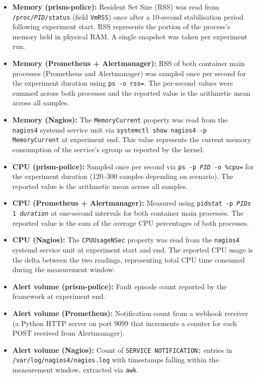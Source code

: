 \begin{itemize}
\item \textbf{Memory (prism-police):} Resident Set Size (RSS) was read from \texttt{/proc/\textit{PID}/status} (field \texttt{VmRSS}) once after a 10-second stabilisation period following experiment start. RSS represents the portion of the process's memory held in physical RAM. A single snapshot was taken per experiment run.
\item \textbf{Memory (Prometheus + Alertmanager):} RSS of both container main processes (Prometheus and Alertmanager) was sampled once per second for the experiment duration using \texttt{ps -o rss=}. The per-second values were summed across both processes and the reported value is the arithmetic mean across all samples.
\item \textbf{Memory (Nagios):} The \texttt{MemoryCurrent} property was read from the \texttt{nagios4} systemd service unit via \texttt{systemctl show nagios4 -p MemoryCurrent} at experiment end. This value represents the current memory consumption of the service's cgroup as reported by the kernel.
\item \textbf{CPU (prism-police):} Sampled once per second via \texttt{ps -p \textit{PID} -o \%cpu=} for the experiment duration (120--300 samples depending on scenario). The reported value is the arithmetic mean across all samples.
\item \textbf{CPU (Prometheus + Alertmanager):} Measured using \texttt{pidstat -p \textit{PIDs} 1 \textit{duration}} at one-second intervals for both container main processes. The reported value is the sum of the average CPU percentages of both processes.
\item \textbf{CPU (Nagios):} The \texttt{CPUUsageNSec} property was read from the \texttt{nagios4} systemd service unit at experiment start and end. The reported CPU usage is the delta between the two readings, representing total CPU time consumed during the measurement window.
\item \textbf{Alert volume (prism-police):} Fault episode count reported by the framework at experiment end.
\item \textbf{Alert volume (Prometheus):} Notification count from a webhook receiver (a Python HTTP server on port 9099 that increments a counter for each POST received from Alertmanager).
\item \textbf{Alert volume (Nagios):} Count of \texttt{SERVICE NOTIFICATION:} entries in \texttt{/var/log/nagios4/nagios.log} with timestamps falling within the measurement window, extracted via \texttt{awk}.
\end{itemize}

